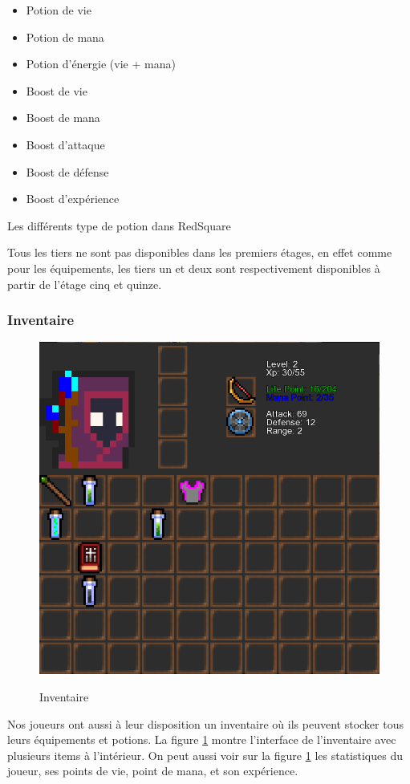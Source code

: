 \documentclass[a4paper, 12pt, twoside]{article}
\begin{document}
\begin{table}[h]
\begin{center}
    \begin{minipage}{10cm}
        \begin{itemize}
        \item Potion de vie
        \item Potion de mana
        \item Potion d'énergie (vie + mana)
        \item Boost de vie
        \item Boost de mana 
        \item Boost d'attaque
        \item Boost de défense 
        \item Boost d'expérience
        \end{itemize}
    \end{minipage}
    \caption{Les différents type de potion dans RedSquare}
    \end{center}
\end{table}
Tous les tiers ne sont pas disponibles dans les premiers étages, en effet comme pour les équipements, les tiers un et deux sont respectivement disponibles à partir de l'étage cinq et quinze.

\subsubsection{Inventaire}
\begin{figure}[H]
    \center
    \includegraphics[scale=0.3]{./Pictures/Inventaire} \\
    \caption{Inventaire}
    \label{Inventaire}
\end{figure}
Nos joueurs ont aussi à leur disposition un inventaire où ils peuvent stocker tous leurs équipements et potions. La figure \ref{Inventaire} montre l'interface de l'inventaire avec plusieurs items à l'intérieur. On peut aussi voir sur la figure \ref{Inventaire} les statistiques du joueur, ses points de vie, point de mana, et son expérience.
\end{document}

